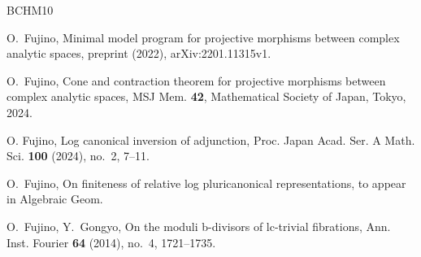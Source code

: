 \documentclass[12pt]{amsart}
\theoremstyle{definition}
\begin{document}
\begin{thebibliography}{BCHM10}



O.~Fujino, Minimal model program for projective morphisms between complex analytic spaces, preprint (2022), arXiv:2201.11315v1. 


O.~Fujino, Cone and contraction theorem for projective morphisms between complex analytic spaces, MSJ Mem. \textbf{42}, Mathematical Society of Japan, Tokyo, 2024. 

O. Fujino, Log canonical inversion of adjunction, Proc. Japan Acad. Ser. A Math. Sci. {\textbf{100}} (2024), no.~2, 7--11. 

O.~Fujino, On finiteness of relative log pluricanonical representations, to appear in Algebraic Geom.








O.~Fujino, Y.~Gongyo, On the moduli b-divisors of lc-trivial fibrations, Ann. Inst. Fourier {\textbf{64}} (2014), no.~4, 1721--1735. 



\end{thebibliography}
\end{document}
